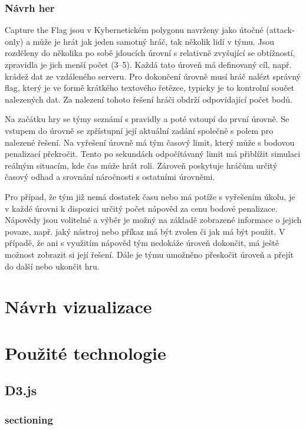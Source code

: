 \documentclass[
  digital, %
  oneside, %
  table,   %
  nolof,     %
  nolot,     %
]{fithesis3}
\begin{document}
\subsection{Návrh her}
Capture the Flag jsou v Kybernetickém polygonu navrženy jako útočné (attack-only) a může je hrát jak jeden samotný hráč, tak několik lidí v týmu. Jsou rozděleny do několika po sobě jdoucích úrovní s relativně zvyšující se obtížností, zpravidla je jich menší počet (3–5). Každá tato úroveň má definovaný cíl, např. krádež dat ze vzdáleného serveru. Pro dokončení úrovně musí hráč nalézt správný flag, který je ve formě krátkého textového řetězce, typicky je to kontrolní součet nalezených dat. Za nalezení tohoto řešení hráči obdrží odpovídající počet bodů. \cite{ctfDesign}\par
Na začátku hry se týmy seznámí s pravidly a poté vstoupí do první úrovně. Se vstupem do úrovně se zpřístupní její aktuální zadání společně s polem pro nalezené řešení. Na vyřešení úrovně má tým časový limit, který může s bodovou penalizací překročit. Tento po sekundách odpočítávaný limit má přiblížit simulaci reálným situacím, kde čas může hrát roli. Zároveň poskytuje hráčům určitý časový odhad a srovnání náročnosti s ostatními úrovněmi.\par
Pro případ, že tým již nemá dostatek času nebo má potíže s vyřešením úkolu, je v každé úrovni k dispozici určitý počet nápověd za cenu bodové penalizace. Nápovědy jsou volitelné a výběr je možný na základě zobrazené informace o jejich povaze, např. jaký nástroj nebo příkaz má být zvolen či jak má být použit. V případě, že ani s využitím nápověd tým nedokáže úroveň dokončit, má ještě možnost zobrazit si její řešení. Dále je týmu umožněno přeskočit úroveň a přejít do další nebo ukončit hru.\par





\chapter{Návrh vizualizace}


\chapter{Použité technologie}
\section{D3.js}
\subsection{sectioning}
\end{document}
